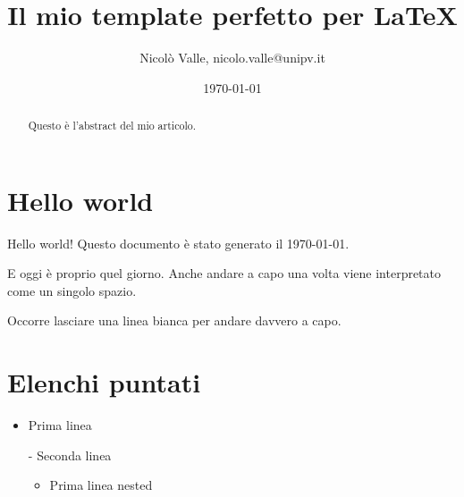 \documentclass[a4paper, 12pt]{article} %
\title{Il mio template perfetto per \LaTeX} %
\date{\today} %
\author{Nicolò Valle, nicolo.valle@unipv.it}
\begin{document}
 

\maketitle  %

\begin{abstract}
  Questo è l'abstract del mio articolo.
  \lipsum[1] %
\end{abstract}


\tableofcontents %



\section{Hello world}

Hello world! Questo                  documento è stato generato il \today.


E oggi è proprio quel giorno.
Anche andare a capo una volta viene interpretato come un singolo spazio.

Occorre lasciare una linea bianca per andare davvero a capo.





\section{Elenchi puntati}

\begin{itemize} %
\item Prima linea
\item[-] Seconda linea %
	\begin{itemize}
		\item Prima linea nested
	\end{itemize}
\end{itemize}
\end{document}
